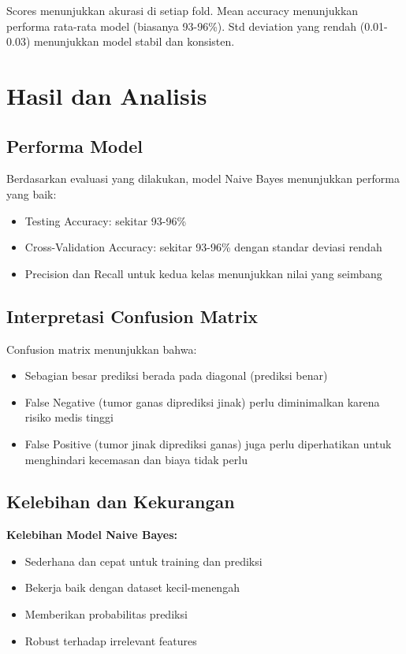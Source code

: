 \documentclass[12pt,a4paper]{article}
\begin{document}
Scores menunjukkan akurasi di setiap fold. Mean accuracy menunjukkan performa rata-rata model (biasanya 93-96\%). Std deviation yang rendah (0.01-0.03) menunjukkan model stabil dan konsisten.

\newpage
\section{Hasil dan Analisis}

\subsection{Performa Model}
Berdasarkan evaluasi yang dilakukan, model Naive Bayes menunjukkan performa yang baik:
\begin{itemize}
    \item Testing Accuracy: sekitar 93-96\%
    \item Cross-Validation Accuracy: sekitar 93-96\% dengan standar deviasi rendah
    \item Precision dan Recall untuk kedua kelas menunjukkan nilai yang seimbang
\end{itemize}

\subsection{Interpretasi Confusion Matrix}
Confusion matrix menunjukkan bahwa:
\begin{itemize}
    \item Sebagian besar prediksi berada pada diagonal (prediksi benar)
    \item False Negative (tumor ganas diprediksi jinak) perlu diminimalkan karena risiko medis tinggi
    \item False Positive (tumor jinak diprediksi ganas) juga perlu diperhatikan untuk menghindari kecemasan dan biaya tidak perlu
\end{itemize}

\subsection{Kelebihan dan Kekurangan}

\textbf{Kelebihan Model Naive Bayes:}
\begin{itemize}
    \item Sederhana dan cepat untuk training dan prediksi
    \item Bekerja baik dengan dataset kecil-menengah
    \item Memberikan probabilitas prediksi
    \item Robust terhadap irrelevant features
\end{itemize}
\end{document}
